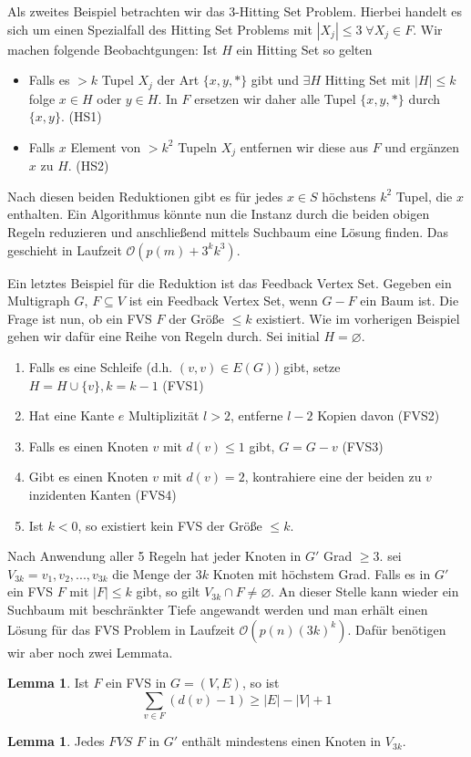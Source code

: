 \documentclass[a4paper, 12pt]{article}
\theoremstyle{plain}
\theoremstyle{definition}
\theoremstyle{lemma}
\newtheorem{lemma}[theorem]{Lemma}
\theoremstyle{remark}
\theoremstyle{corollary}
\theoremstyle{example}
\begin{document}
	Als zweites Beispiel betrachten wir das 3-Hitting Set Problem. Hierbei handelt es sich um einen Spezialfall des Hitting Set Problems mit $\left|X_j\right| \leq 3 \; \forall X_j \in F$. Wir machen folgende Beobachtgungen:
	Ist $H$ ein Hitting Set so gelten 
	\begin{itemize}
		\item Falls es $>k$ Tupel $X_j$ der Art $\{x,y,*\}$ gibt und $\exists H$ Hitting Set mit $\left|H\right| \leq k$ folge $x \in H$ oder $y \in H$. In $F$ ersetzen wir daher alle Tupel $\{x,y,*\}$ durch $\{x,y\}$. (HS1)
		\item Falls $x$ Element von $>k^2$ Tupeln $X_j$ entfernen wir diese aus $F$ und ergänzen $x$ zu $H$. (HS2)
	\end{itemize}
	Nach diesen beiden Reduktionen gibt es für jedes $x \in S$ höchstens $k^2$ Tupel, die $x$ enthalten. Ein Algorithmus könnte nun die Instanz durch die beiden obigen Regeln reduzieren und anschließend mittels Suchbaum eine Lösung finden. Das geschieht in Laufzeit $\mathcal{O}(p(m) + 3^kk^3)$.
	
	Ein letztes Beispiel für die Reduktion ist das Feedback Vertex Set. Gegeben ein Multigraph $G$, $F \subseteq V$ ist ein Feedback Vertex Set, wenn $G-F$ ein Baum ist. Die Frage ist nun, ob ein FVS $F$ der Größe $\leq k$ existiert. Wie im vorherigen Beispiel gehen wir dafür eine Reihe von Regeln durch. Sei initial $H=\varnothing$.
	\begin{enumerate}
		\item Falls es eine Schleife (d.h. $(v,v) \in E(G)$) gibt, setze $H=H\cup \{v\}, k=k-1$ (FVS1)
		\item Hat eine Kante $e$ Multiplizität $l>2$, entferne $l-2$ Kopien davon (FVS2)
		\item Falls es einen Knoten $v$ mit $d(v) \leq 1$ gibt, $G = G-v$ (FVS3)
		\item Gibt es einen Knoten $v$ mit $d(v) = 2$, kontrahiere eine der beiden zu $v$ inzidenten Kanten (FVS4)
		\item Ist $k<0$, so existiert kein FVS der Größe $\leq k$.
	\end{enumerate}
	Nach Anwendung aller 5 Regeln hat jeder Knoten in $G'$ Grad $\geq 3$. sei $V_{3k} = {v_1,v_2,...,v_{3k}}$ die Menge der $3k$ Knoten mit höchstem Grad. Falls es in $G'$ ein FVS $F$ mit $\left|F\right| \leq k$ gibt, so gilt $V_{3k} \cap F \neq \varnothing$. An dieser Stelle kann wieder ein Suchbaum mit beschränkter Tiefe angewandt werden und man erhält einen Lösung für das FVS Problem in Laufzeit $\mathcal{O}(p(n)(3k)^k)$. Dafür benötigen wir aber noch zwei Lemmata.
	\begin{lemma}
		Ist $F$ ein FVS in $G=(V,E)$, so ist \[\sum_{v \in F} (d(v)-1) \geq \left|E\right|-\left|V\right|+1\]
	\end{lemma} 
	\begin{lemma}
		Jedes $FVS$ $F$ in $G'$ enthält mindestens einen Knoten in $V_{3k}$.
	\end{lemma}
\end{document}
